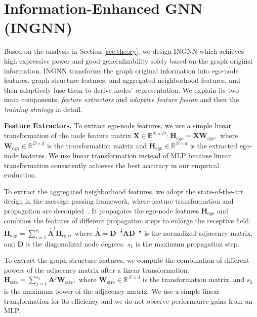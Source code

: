 \documentclass{article}
\theoremstyle{plain}
\newcommand{\pjn}{{INGNN}}
\begin{document}
\section{Information-Enhanced GNN (INGNN)} \label{sec:ModelDesign}
Based on the analysis in Section \ref{sec:theory}, we design \pjn{} which achieves high expressive power and good generalizability solely based on the graph original information. \pjn{} transforms the graph original information into ego-node features, graph structure features, and aggregated neighborhood features, and then adaptively fuse them to derive nodes' representation.  We explain its two main components, \textit{feature extractors} and \textit{adaptive feature fusion} and then the \textit{training strategy} in detail. 






\textbf{Feature Extractors.} 
To extract ego-node features, we use a simple linear transformation of the node feature matrix $\mathbf{X} \in \mathbb{R}^{N \times D}$:
$\mathbf{H}_\text{ego} = \mathbf{X} \mathbf{W}_\text{ego},$
where $\mathbf{W}_\text{ego} \in \mathbb{R}^{D \times d}$ is the transformation matrix and $\mathbf{H}_\text{ego} \in \mathbb{R}^{N \times d}$ is the extracted ego-node features. We use linear transformation instead of MLP because linear transformation consistently achieves the best accuracy in our empirical evaluation. 



To extract the aggregated neighborhood features, we adopt the state-of-the-art design in the message passing framework, where feature transformation and propagation are decoupled~\cite{zeng2021decoupling}. 
It propagates the ego-node features $\mathbf{H}_\text{ego}$ and combines the features of different propagation steps to enlarge the receptive field: 
$\mathbf{H}_\text{agg} = \sum_{i=1}^{s_1} \hat{\mathbf{A}}^{i} \mathbf{H}_\text{ego},$
where $\hat{\mathbf{A}} = \mathbf{D}^{- \frac{1}{2}} \mathbf{A} \mathbf{D}^{- \frac{1}{2}}$ is the normalized adjacency matrix, and $\mathbf{D}$ is the diagonalized node degrees. $s_1$ is the maximum propagation step. 



To extract the graph structure features, we compute the combination of different powers of the adjacency matrix after a linear transformation: 
$\mathbf{H}_\text{strc} = \sum_{j=1}^{s_2} \mathbf{A}^{j} \mathbf{W}_\text{strc},
$
where $\mathbf{W}_\text{strc} \in \mathbb{R}^{N \times d}$ is the transformation matrix, and $s_2$ is the maximum power of the adjacency matrix. 
We use a simple linear transformation for its efficiency and we do not observe performance gains from an MLP.  
\end{document}
